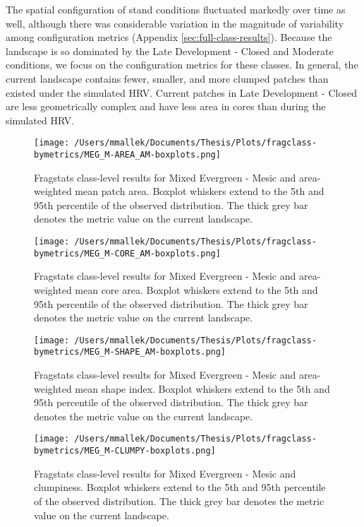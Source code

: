 The spatial configuration of stand conditions fluctuated markedly over time as well, although there was considerable variation in the magnitude of variability among configuration metrics (Appendix \ref{sec:full-class-results}). Because the landscape is so dominated by the Late Development - Closed and Moderate conditions, we focus on the configuration metrics for these classes. In general, the current landscape contains fewer, smaller, and more clumped patches than existed under the simulated HRV. Current patches in Late Development - Closed are less geometrically complex and have less area in cores than during the simulated HRV.


\begin{figure}[!htbp]
\centering
    \texttt{[image: /Users/mmallek/Documents/Thesis/Plots/fragclass-bymetrics/MEG\_M-AREA\_AM-boxplots.png]}
  \caption{Fragstats class-level results for Mixed Evergreen - Mesic and area-weighted mean patch area. Boxplot whiskers extend to the 5th and 95th percentile of the observed distribution. The thick grey bar denotes the metric value on the current landscape.}
  \label{fig:megm_areaam}
\end{figure}


\begin{figure}[!htbp]
\centering
    \texttt{[image: /Users/mmallek/Documents/Thesis/Plots/fragclass-bymetrics/MEG\_M-CORE\_AM-boxplots.png]}
  \caption{Fragstats class-level results for Mixed Evergreen - Mesic and area-weighted mean core area. Boxplot whiskers extend to the 5th and 95th percentile of the observed distribution. The thick grey bar denotes the metric value on the current landscape.}
  \label{fig:megm_coream}
\end{figure}


\begin{figure}[!htbp]
\centering
    \texttt{[image: /Users/mmallek/Documents/Thesis/Plots/fragclass-bymetrics/MEG\_M-SHAPE\_AM-boxplots.png]}
  \caption{Fragstats class-level results for Mixed Evergreen - Mesic and area-weighted mean shape index. Boxplot whiskers extend to the 5th and 95th percentile of the observed distribution. The thick grey bar denotes the metric value on the current landscape.}
  \label{fig:megm_shapeam}
\end{figure}


\begin{figure}[!htbp]
\centering
    \texttt{[image: /Users/mmallek/Documents/Thesis/Plots/fragclass-bymetrics/MEG\_M-CLUMPY-boxplots.png]}
  \caption{Fragstats class-level results for Mixed Evergreen - Mesic and clumpiness. Boxplot whiskers extend to the 5th and 95th percentile of the observed distribution. The thick grey bar denotes the metric value on the current landscape.}
  \label{fig:megm_clumpy}
\end{figure}

